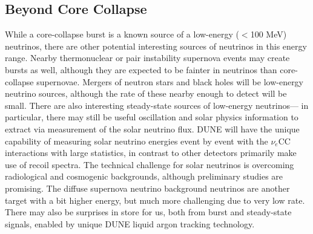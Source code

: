 \subsection{Beyond Core Collapse}
While a core-collapse burst is a known source of a
low-energy ($<$100 MeV) neutrinos, there are other potential
interesting sources of neutrinos in this energy range.  Nearby
thermonuclear or pair instability supernova events may create bursts
as well, although they are expected to be fainter in neutrinos than
core-collapse supernovae.  Mergers of neutron stars and black holes
will be low-energy neutrino sources, although the rate of these nearby
enough to detect will be small.  There are also interesting
steady-state sources of low-energy neutrinos--- in particular, there
may still be useful oscillation and solar physics information to
extract via measurement of the solar neutrino flux. DUNE will have the
unique capability of measuring solar neutrino energies event by event
with the $\nu_e$CC interactions with large statistics, in contrast to
other detectors primarily make use of recoil spectra.  The technical
challenge for solar neutrinos is overcoming radiological and
cosmogenic backgrounds, although preliminary studies are promising.
The diffuse supernova neutrino background neutrinos are another target
with a bit higher energy, but much more challenging due to very low
rate.  There may also be surprises in store for us, both from burst
and steady-state signals, enabled by unique DUNE liquid argon tracking
technology.












